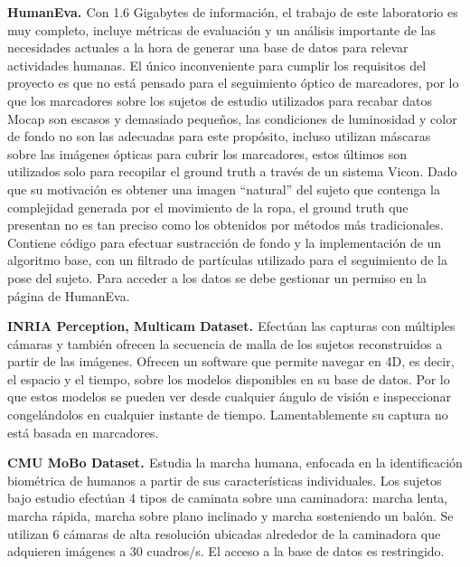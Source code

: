 \textbf{HumanEva. \cite{HumanEvaWeb}}
Con 1.6 Gigabytes de información, el trabajo de este laboratorio es muy completo, incluye métricas de evaluación y un análisis importante de las necesidades actuales a la hora de generar una base de datos para relevar actividades humanas. El único inconveniente para cumplir los requisitos del proyecto es que no está pensado para el seguimiento óptico de marcadores, por lo que los marcadores sobre los sujetos de estudio utilizados para recabar datos Mocap son escasos y demasiado pequeños, las condiciones de luminosidad y color de fondo no son las adecuadas para este propósito, incluso utilizan máscaras sobre las imágenes ópticas para cubrir los marcadores, estos últimos son utilizados solo para recopilar el ground truth a través de un sistema Vicon.  Dado que su motivación es obtener una imagen ``natural'' del sujeto que contenga la complejidad generada por el movimiento de la ropa, el ground truth que presentan  no es tan preciso como los obtenidos por métodos más tradicionales.  Contiene código para efectuar sustracción de fondo y la implementación de un algoritmo base, con un filtrado de partículas utilizado para el seguimiento de la pose del sujeto. Para acceder a los datos se debe gestionar un permiso en la página de HumanEva. 

\textbf{INRIA Perception, Multicam Dataset. \cite{INRIA}}
Efectúan las capturas con múltiples cámaras y también ofrecen la secuencia de malla de los sujetos reconstruidos a partir de las imágenes. Ofrecen un software que permite navegar en 4D, es decir, el espacio y el tiempo, sobre los modelos disponibles en su base de datos. Por lo que estos modelos se pueden ver desde cualquier ángulo de visión e inspeccionar congelándolos en cualquier instante de tiempo. Lamentablemente su captura no está basada en marcadores. 

\textbf{CMU MoBo Dataset. \cite{Mobo}}
Estudia la marcha humana, enfocada en la identificación biométrica de humanos a partir de sus características individuales. Los sujetos bajo estudio efectúan 4 tipos de caminata sobre una caminadora: marcha lenta, marcha rápida, marcha sobre plano inclinado y marcha sosteniendo un balón. Se utilizan 6 cámaras de alta resolución ubicadas alrededor de la caminadora que adquieren imágenes a 30 cuadros/s. El acceso a la base de datos es restringido.

